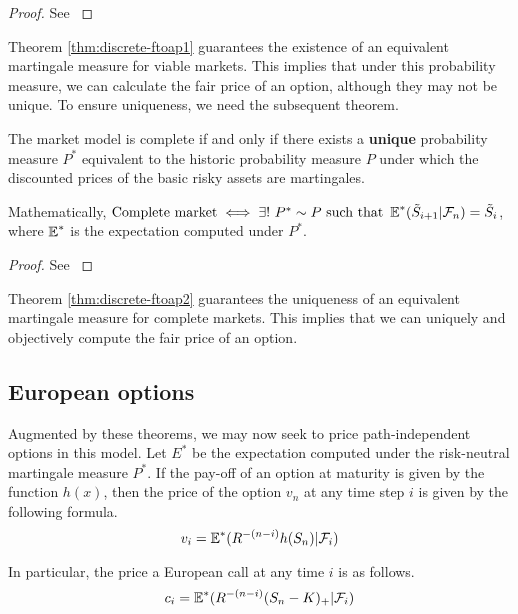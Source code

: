 \begin{proof}
	See \cite[page 6, Theorem 1.2.7]{Lamberton1996}
\end{proof}

Theorem \ref{thm:discrete-ftoap1} guarantees the existence of an equivalent martingale measure for viable markets. This implies that under this probability measure, we can calculate the fair price of an option, although they may not be unique. To ensure uniqueness, we need the subsequent theorem.

\begin{thm}
	\label{thm:discrete-ftoap2}
	The market model is complete if and only if there exists a \textbf{unique} probability measure $ P^* $ equivalent to the historic probability measure $ P $ under which the discounted prices of the basic risky assets are martingales.
	
	Mathematically,
	$ \text{Complete market} \iff \exists! \  P^* \sim P \text{ such that } \operatorname{\mathbb{E}}^*( \tilde{S}_{i+1} | \mathcal{F}_n ) = \tilde{S}_{i} $, where $ \operatorname{\mathbb{E}}^* $ is the expectation computed under $ P^* $.
\end{thm}

\begin{proof}
	See \cite[page 9, Theorem 1.3.4]{Lamberton1996}
\end{proof}

Theorem \ref{thm:discrete-ftoap2} guarantees the uniqueness of an equivalent martingale measure for complete markets. This implies that we can uniquely and objectively compute the fair price of an option.



\subsection{European options}

Augmented by these theorems, we may now seek to price path-independent options in this model. Let $ E^* $ be the expectation computed under the risk-neutral martingale measure $ P^* $. If the pay-off of an option at maturity is given by the function $ h(x) $, then the price of the option $ v_n $ at any time step $ i $ is given by the following formula.
\begin{equation}
	\label{eq:discrete-crr-eu-pr}
	v_i = \operatorname{\mathbb{E}}^*( R^{-(n - i)} h(S_n) | \mathcal{F}_i )
\end{equation}

In particular, the price a European call at any time $ i $ is as follows.
\begin{equation}
	\label{eq:discrete-crr-eu-call-pr}
	c_i = \operatorname{\mathbb{E}}^*( R^{-(n - i)} (S_n - K)_+ | \mathcal{F}_i )
\end{equation}


